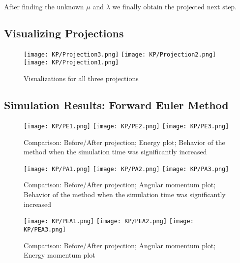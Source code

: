 \documentclass[11pt]{article}
\begin{document}
After finding the unknown $\mu$ and $\lambda$ we finally obtain the projected next step.

\subsection*{Visualizing Projections}

\begin{figure}[H]
  \centering
  \texttt{[image: KP/Projection3.png]} \hfill
  \texttt{[image: KP/Projection2.png]} \hfill
  \texttt{[image: KP/Projection1.png]} 
  \caption{Visualizations for all three projections}
  \label{fig:three-in-line}
\end{figure}

\clearpage

\subsection{Simulation Results: Forward Euler Method}

\begin{figure}[H]
  \centering
  \texttt{[image: KP/PE1.png]} \hfill
  \texttt{[image: KP/PE2.png]} \hfill
  \texttt{[image: KP/PE3.png]} 
  \caption{Comparison: Before/After projection; Energy plot; Behavior of the method when the simulation time was significantly increased}
  \label{fig:three-in-line}
\end{figure}

\begin{figure}[H]
  \centering
  \texttt{[image: KP/PA1.png]} \hfill
  \texttt{[image: KP/PA2.png]} \hfill
  \texttt{[image: KP/PA3.png]} 
  \caption{Comparison: Before/After projection; Angular momentum plot; Behavior of the method when the simulation time was significantly increased}
  \label{fig:three-in-line}
\end{figure}

\clearpage

\begin{figure}[H]
  \centering
  \texttt{[image: KP/PEA1.png]} \hfill
  \texttt{[image: KP/PEA2.png]} \hfill
  \texttt{[image: KP/PEA3.png]} 
  \caption{Comparison: Before/After projection; Angular momentum plot; Energy momentum plot}
  \label{fig:three-in-line}
\end{figure}
\end{document}
